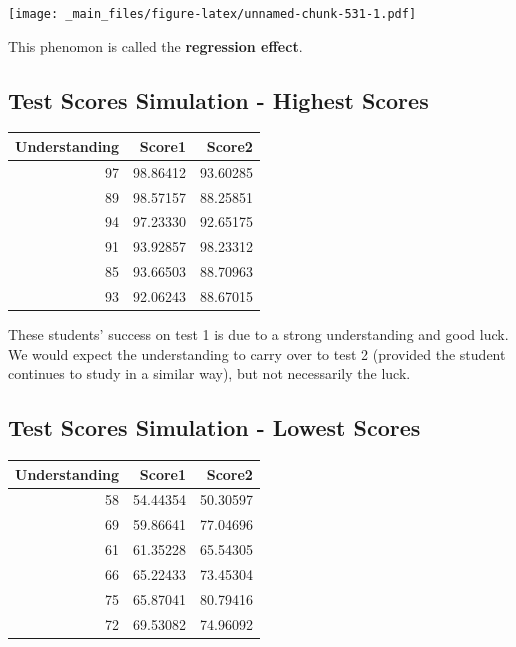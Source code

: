 \documentclass[]{book}
\newenvironment{Shaded}{\begin{snugshade}}{\end{snugshade}}
\newcommand{\KeywordTok}[1]{\textcolor[rgb]{0.13,0.29,0.53}{\textbf{#1}}}
\newcommand{\OperatorTok}[1]{\textcolor[rgb]{0.81,0.36,0.00}{\textbf{#1}}}
\newcommand{\NormalTok}[1]{#1}
\begin{document}
\texttt{[image: \_main\_files/figure-latex/unnamed-chunk-531-1.pdf]}

This phenomon is called the \textbf{regression effect}.

\subsection{Test Scores Simulation - Highest
Scores}\label{test-scores-simulation---highest-scores}

\begin{Shaded}
\end{Shaded}

\begin{tabular}{r|r|r}
\hline
Understanding & Score1 & Score2\\
\hline
97 & 98.86412 & 93.60285\\
\hline
89 & 98.57157 & 88.25851\\
\hline
94 & 97.23330 & 92.65175\\
\hline
91 & 93.92857 & 98.23312\\
\hline
85 & 93.66503 & 88.70963\\
\hline
93 & 92.06243 & 88.67015\\
\hline
\end{tabular}

These students' success on test 1 is due to a strong understanding and
good luck. We would expect the understanding to carry over to test 2
(provided the student continues to study in a similar way), but not
necessarily the luck.

\subsection{Test Scores Simulation - Lowest
Scores}\label{test-scores-simulation---lowest-scores}

\begin{Shaded}
\end{Shaded}

\begin{tabular}{r|r|r}
\hline
Understanding & Score1 & Score2\\
\hline
58 & 54.44354 & 50.30597\\
\hline
69 & 59.86641 & 77.04696\\
\hline
61 & 61.35228 & 65.54305\\
\hline
66 & 65.22433 & 73.45304\\
\hline
75 & 65.87041 & 80.79416\\
\hline
72 & 69.53082 & 74.96092\\
\hline
\end{tabular}
\end{document}

